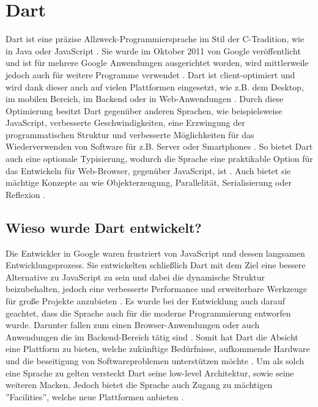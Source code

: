 \section{Dart}
\label{sec:Grundlagen:Dart}

Dart ist eine präzise Allzweck-Programmiersprache im Stil der C-Tradition, wie in Java oder JavaScript \cite{article:Dart:JavaAndDart_AfafMirghaniHassan, book:Dart:DPL_GiladBracha, book:Dart:StartGuideDart_SanjibSinha}. 
Sie wurde im Oktober 2011 von Google veröffentlicht und ist für mehrere Google Anwendungen ausgerichtet worden, wird mittlerweile jedoch auch für weitere Programme verwendet \cite{article:Dart:JavaAndDart_AfafMirghaniHassan, book:Dart:DPL_GiladBracha}.
Dart ist client-optimiert und wird dank dieser auch auf vielen Plattformen eingesetzt, wie z.B. dem Desktop, im mobilen Bereich, im Backend oder in Web-Anwendungen \cite{book:Dart:StartGuideDart_SanjibSinha}. 
Durch diese Optimierung besitzt Dart gegenüber anderen Sprachen, wie beispielsweise JavaScript, verbesserte Geschwindigkeiten, eine Erzwingung der programmatischen Struktur und verbesserte Möglichkeiten für das Wiederverwenden von Software für z.B. Server oder Smartphones \cite{article:Dart:JavaAndDart_AfafMirghaniHassan}.
So bietet Dart auch eine optionale Typisierung, wodurch die Sprache eine praktikable Option für das Entwickeln für Web-Browser, gegenüber JavaScript, ist \cite{book:Dart:DPL_GiladBracha}.
Auch bietet sie mächtige Konzepte an wie Objekterzeugung, Parallelität, Serialisierung oder Reflexion \cite{article:Dart:JavaAndDart_AfafMirghaniHassan}.

\subsection{Wieso wurde Dart entwickelt?}
\label{subsec:Dart:Why}
Die Entwickler in Google waren frustriert von JavaScript und dessen langsamen Entwicklungsprozess. Sie entwickelten schließlich Dart mit dem Ziel eine bessere Alternative zu JavaScript zu sein und dabei die dynamische Struktur beizubehalten, jedoch eine verbesserte Performance und erweiterbare Werkzeuge für große Projekte anzubieten \cite{article:Dart:JavaAndDart_AfafMirghaniHassan}.
Es wurde bei der Entwicklung auch darauf geachtet, dass die Sprache auch für die moderne Programmierung entworfen wurde. Darunter fallen zum einen Browser-Anwendungen oder auch Anwendungen die im Backend-Bereich tätig sind \cite{book:Dart:DPL_GiladBracha}.
Somit hat Dart die Absicht eine Plattform zu bieten, welche zukünftige Bedürfnisse, aufkommende Hardware und die beseitigung von Softwareproblemen unterstützen möchte \cite{article:Dart:JavaAndDart_AfafMirghaniHassan}.
Um als solch eine Sprache zu gelten versteckt Dart seine low-level Architektur, sowie seine weiteren Macken. Jedoch bietet die Sprache auch Zugang zu mächtigen ''Facilities'', welche neue Plattformen anbieten \cite{article:Dart:JavaAndDart_AfafMirghaniHassan, book:Dart:DPL_GiladBracha}.


